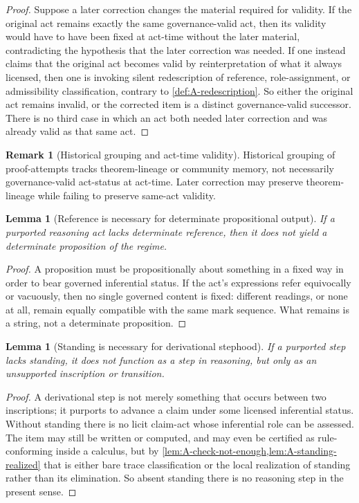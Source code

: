 \documentclass[11pt]{article}
\theoremstyle{plain}
\newtheorem{lemma}[theorem]{Lemma}
\theoremstyle{definition}
\newtheorem{remark}[theorem]{Remark}
\begin{document}
\begin{proof}
Suppose a later correction changes the material required for validity. If the original act remains exactly the same governance-valid act, then its validity would have to have been fixed at act-time without the later material, contradicting the hypothesis that the later correction was needed. If one instead claims that the original act becomes valid by reinterpretation of what it always licensed, then one is invoking silent redescription of reference, role-assignment, or admissibility classification, contrary to \cref{def:A-redescription}. So either the original act remains invalid, or the corrected item is a distinct governance-valid successor. There is no third case in which an act both needed later correction and was already valid as that same act.
\end{proof}

\begin{remark}[Historical grouping and act-time validity]
Historical grouping of proof-attempts tracks theorem-lineage or community memory, not necessarily governance-valid act-status at act-time. Later correction may preserve theorem-lineage while failing to preserve same-act validity.
\end{remark}

\begin{lemma}[Reference is necessary for determinate propositional output]
\label{lem:A-reference}
If a purported reasoning act lacks determinate reference, then it does not yield a determinate proposition of the regime.
\end{lemma}

\begin{proof}
A proposition must be propositionally about something in a fixed way in order to bear governed inferential status. If the act's expressions refer equivocally or vacuously, then no single governed content is fixed: different readings, or none at all, remain equally compatible with the same mark sequence. What remains is a string, not a determinate proposition.
\end{proof}

\begin{lemma}[Standing is necessary for derivational stephood]
\label{lem:A-standing}
If a purported step lacks standing, it does not function as a step in reasoning, but only as an unsupported inscription or transition.
\end{lemma}

\begin{proof}
A derivational step is not merely something that occurs between two inscriptions; it purports to advance a claim under some licensed inferential status. Without standing there is no licit claim-act whose inferential role can be assessed. The item may still be written or computed, and may even be certified as rule-conforming inside a calculus, but by \cref{lem:A-check-not-enough,lem:A-standing-realized} that is either bare trace classification or the local realization of standing rather than its elimination. So absent standing there is no reasoning step in the present sense.
\end{proof}
\end{document}
